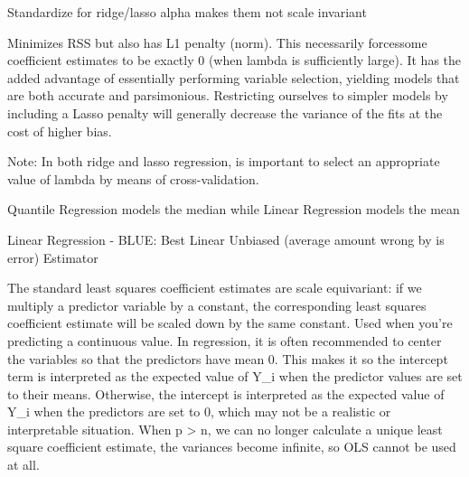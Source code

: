 \documentclass[]{book}
\begin{document}
Standardize for ridge/lasso alpha makes them not scale invariant

Minimizes RSS but also has L1 penalty (norm). This necessarily forcessome coefficient estimates to be exactly 0 (when lambda is sufficiently large). It has the added advantage of essentially performing variable selection, yielding models that are both accurate and parsimonious. Restricting ourselves to simpler models by including a Lasso penalty will generally decrease the variance of the fits at the cost of higher bias.

Note: In both ridge and lasso regression, is important to select an appropriate value of lambda by means of cross-validation.

Quantile Regression models the median while Linear Regression models the mean

Linear Regression - BLUE: Best Linear Unbiased (average amount wrong by is error) Estimator

The standard least squares coefficient estimates are scale equivariant: if we multiply a predictor variable by a constant, the corresponding least squares coefficient estimate will be scaled down by the same constant. Used when you're predicting a continuous value. In regression, it is often recommended to center the variables so that the predictors have mean 0. This makes it so the intercept term is interpreted as the expected value of Y\_i when the predictor values are set to their means. Otherwise, the intercept is interpreted as the expected value of Y\_i when the predictors are set to 0, which may not be a realistic or interpretable situation. When p \textgreater{} n, we can no longer calculate a unique least square coefficient estimate, the variances become infinite, so OLS cannot be used at all.
\end{document}

